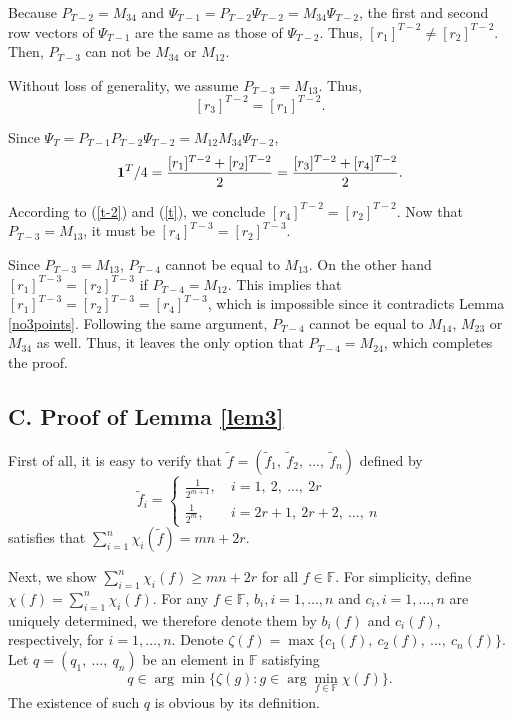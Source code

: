 \documentclass[a4paper, 11pt]{article}
\begin{document}
Because $P_{T-2}=M_{34}$ and $\Psi_{T-1}=P_{T-2}\Psi_{T-2}=M_{34}\Psi_{T-2}$, the first and second row vectors of $\Psi_{T-1}$ are the same as those of $\Psi_{T-2}$.
Thus, $[{r}_1]^{T-2}\neq [{r}_2]^{T-2}$. Then, $P_{T-3}$ can not be $M_{34}$ or $M_{12}$.

Without loss of generality, we assume $P_{T-3}=M_{13}$.
Thus,
\begin{equation}\label{t-2}
[{r}_3]^{T-2}=[{r}_1]^{T-2}.
\end{equation}

Since $\Psi_{T}=P_{T-1}P_{T-2}\Psi_{T-2}=M_{12}M_{34}\Psi_{T-2}$,
\begin{equation}\label{t}
{\bf{1}}^T/4=\frac{[{r}_1]^{T-2}+[{r}_2]^{T-2}}{2}=\frac{[{r}_3]^{T-2}+[{r}_4]^{T-2}}{2}.
\end{equation}

According to (\ref{t-2}) and (\ref{t}), we conclude $[{r}_4]^{T-2}=[{r}_2]^{T-2}$. Now that $P_{T-3}=M_{13}$, it must be $[{r}_4]^{T-3}=[{r}_2]^{T-3}$.

Since $P_{T-3}=M_{13}$, $P_{T-4}$ cannot be equal to $M_{13}$. On the other hand   $[{r}_1]^{T-3}=[{r}_2]^{T-3}$ if $P_{T-4}=M_{12}$. This implies that $[{r}_1]^{T-3}=[{r}_2]^{T-3}=[{r}_4]^{T-3}$, which is impossible since it contradicts Lemma \ref{no3points}. Following the same argument, $P_{T-4}$ cannot be equal to $M_{14}$, $M_{23}$ or $M_{34}$ as well.
Thus, it leaves the only option that $P_{T-4}=M_{24}$, which completes the proof.


\subsection*{C. Proof of Lemma \ref{lem3}} First of all, it is easy to verify that $\tilde{f}=(\tilde{f}_1,\ \tilde{f}_2,\ ...,\ \tilde{f}_n)$ defined by
\[\tilde{f}_i=
\begin{cases}
\frac{1}{2^{m+1}}, &\ i=1,\ 2,\ ...,\ 2r\\
\frac{1}{2^{m}}, &\ i=2r+1,\ 2r+2,\ ...,\ n
\end{cases}
\]
satisfies that $\sum_{i=1}^{n}\chi_i(\tilde{f}) =mn+2r$.

Next, we show $\sum_{i=1}^{n}\chi_i({f}) \geq mn+2r$ for all $f\in \mathbb{F}$. For simplicity,  define $\chi(f)=\sum_{i=1}^{n}\chi_i({f})$. For any $f\in \mathbb{F}$,  $b_i,i=1,\dots,n$ and $c_i,i=1,\dots,n$ are uniquely determined, we therefore denote them by $b_i(f)$ and $c_i(f)$, respectively, for $i=1,\dots,n$. Denote $\zeta(f)=\max\{c_1(f),\ c_2(f),\ ...,\ c_n(f)\}$. Let $q=(q_1,\ ...,\ q_n)$ be an element in $\mathbb{F}$ satisfying
$$
q\in\arg \min \Big\{\zeta(g): g\in \arg \min_{f\in \mathbb{F}}\chi(f)\Big\}.
$$
The existence of such $q$ is obvious by its definition.
\end{document}
